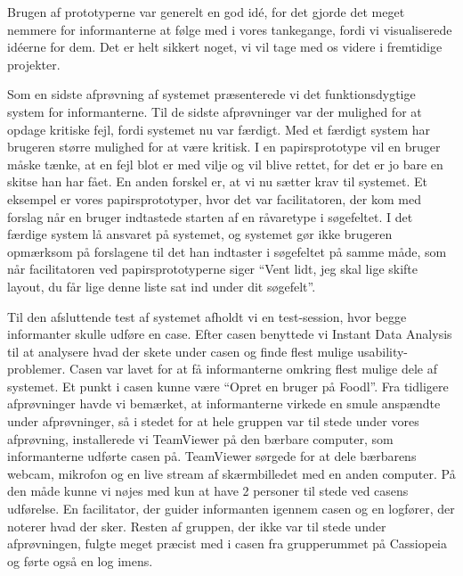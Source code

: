 Brugen af prototyperne var generelt en god idé, for det gjorde det meget nemmere for informanterne at følge med i vores tankegange, fordi vi visualiserede idéerne for dem. Det er helt sikkert noget, vi vil tage med os videre i fremtidige projekter.

Som en sidste afprøvning af systemet præsenterede vi det funktionsdygtige system for informanterne. 
Til de sidste afprøvninger var der mulighed for at opdage kritiske fejl, fordi systemet nu var færdigt. Med et færdigt system har brugeren større mulighed for at være kritisk. I en papirsprototype vil en bruger måske tænke, at en fejl blot er med vilje og vil blive rettet, for det er jo bare en skitse han har fået. En anden forskel er, at vi nu sætter krav til systemet. Et eksempel er vores papirsprototyper, hvor det var facilitatoren, der kom med forslag når en bruger indtastede starten af en råvaretype i søgefeltet. I det færdige system lå ansvaret på systemet, og systemet gør ikke brugeren opmærksom på forslagene til det han indtaster i søgefeltet på samme måde, som når facilitatoren ved papirsprototyperne siger ``Vent lidt, jeg skal lige skifte layout, du får lige denne liste sat ind under dit søgefelt''.

Til den afsluttende test af systemet afholdt vi en test-session, hvor begge informanter skulle udføre en case. Efter casen benyttede vi Instant Data Analysis\cite{ida} til at analysere hvad der skete under casen og finde flest mulige usability-problemer. Casen var lavet for at få informanterne omkring flest mulige dele af systemet. Et punkt i casen kunne \fx være ``Opret en bruger på Foodl''. Fra tidligere afprøvninger havde vi bemærket, at informanterne virkede en smule anspændte under afprøvninger, så i stedet for at hele gruppen var til stede under vores afprøvning, installerede vi TeamViewer på den bærbare computer, som informanterne udførte casen på. TeamViewer sørgede for at dele bærbarens webcam, mikrofon og en live stream af skærmbilledet med en anden computer. På den måde kunne vi nøjes med kun at have 2 personer til stede ved casens udførelse. En facilitator, der guider informanten igennem casen og en logfører, der noterer hvad der sker. Resten af gruppen, der ikke var til stede under afprøvningen, fulgte meget præcist med i casen fra grupperummet på Cassiopeia og førte også en log imens.

